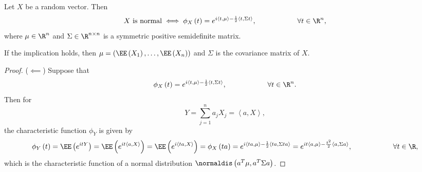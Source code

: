 \documentclass[stat901]{subfiles}
\begin{document}
    \begin{theorem}{}
        Let $X$ be a random vector. Then
        \begin{equation*}
            X\text{ is normal}\iff \phi_{X}\left( t \right) = e^{i\left\langle t, \mu\right\rangle-\frac{1}{2}\left\langle t, \Sigma t\right\rangle},\hspace{2cm}\forall t\in\R^n,
        \end{equation*} 
        where $\mu\in\R^n$ and $\Sigma\in\R^{n\times n}$ is a symmetric positive semidefinite matrix.

        If the implication holds, then $\mu = \left( \EE\left( X_1 \right),\ldots,\EE\left( X_n \right) \right)$ and $\Sigma$ is the covariance matrix of $X$.
    \end{theorem}

    \begin{proof}
        ($\impliedby$) Suppose that
        \begin{equation*}
            \phi_X\left( t \right) = e^{i\left< t,\mu \right> -\frac{1}{2}\left\langle t, \Sigma t\right\rangle},\hspace{2cm}\forall t\in\R^n.
        \end{equation*}
        Then for
        \begin{equation*}
            Y = \sum^{n}_{j=1} a_jX_j = \left\langle a, X\right\rangle,
        \end{equation*}
        the characteristic function $\phi_Y$ is given by
        \begin{equation*}
            \phi_Y\left( t \right) = \EE\left( e^{itY} \right) = \EE\left( e^{it\left< a,X \right> } \right) = \EE\left( e^{i\left\langle ta, X\right\rangle} \right) = \phi_X\left( ta \right) = e^{i\left\langle ta, \mu\right\rangle-\frac{1}{2}\left\langle ta, \Sigma ta\right\rangle} = e^{it\left\langle a, \mu\right\rangle-\frac{t^{2}}{2}\left< a,\Sigma a \right> },\hspace{2cm}\forall t\in\R,
        \end{equation*}
        which is the characteristic function of a normal distribution $\normaldis\left( a^{T}\mu, a^{T}\Sigma a \right)$.


\end{proof}
\end{document}
